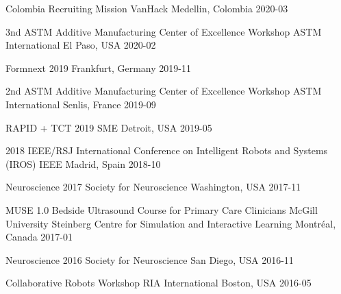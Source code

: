 \begin{cvhonors}

\cvhonor
{Colombia Recruiting Mission}
{VanHack}
{Medellin, Colombia}
{2020-03}

\cvhonor
{3nd ASTM Additive Manufacturing Center of Excellence Workshop}
{ASTM International}
{El Paso, USA}
{2020-02}

\cvhonor
{Formnext 2019}
{}
{Frankfurt, Germany}
{2019-11}

\cvhonor
{2nd ASTM Additive Manufacturing Center of Excellence Workshop}
{ASTM International}
{Senlis, France}
{2019-09}

\cvhonor
{RAPID + TCT 2019}
{SME}
{Detroit, USA}
{2019-05}

\cvhonor
{2018 IEEE/RSJ International Conference on Intelligent Robots and Systems (IROS)}
{IEEE}
{Madrid, Spain}
{2018-10}

\cvhonor
{Neuroscience 2017}
{Society for Neuroscience}
{Washington, USA}
{2017-11}

\cvhonor
{MUSE 1.0 Bedside Ultrasound Course for Primary Care Clinicians}
{McGill University Steinberg Centre for Simulation and Interactive Learning}
{Montréal, Canada}
{2017-01}

\cvhonor
{Neuroscience 2016}
{Society for Neuroscience}
{San Diego, USA}
{2016-11}

\cvhonor
{Collaborative Robots Workshop}
{RIA International}
{Boston, USA}
{2016-05}


\end{cvhonors}

